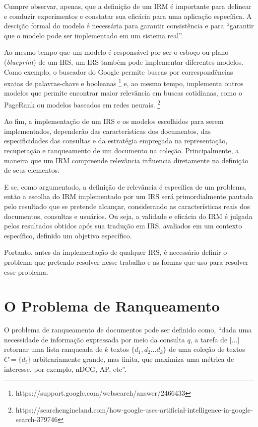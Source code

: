 \documentclass[
	12pt,				%
	openright,			%
	oneside,			%
	a4paper,			%
	english,			%
	french,				%
	spanish,			%
	brazil				%
	]{abntex2}
\begin{document}
Cumpre observar, apenas, que a definição de um IRM é importante para delinear e conduzir experimentos e constatar sua eficácia para uma aplicação específica.
A descição formal do modelo é necessária para garantir consistência e para ``garantir que o modelo pode ser implementado em um sistema real''.\cite{Hiemstra2009}

Ao mesmo tempo que um modelo é responsável por ser o esboço ou plano (\textit{blueprint}) de um IRS, um IRS também pode implementar diferentes modelos.
Como exemplo, o buscador do Google permite buscas por correspondências exatas de palavras-chave e booleanas
\footnote{https://support.google.com/websearch/answer/2466433}
e, ao mesmo tempo, implementa outros modelos que permite encontrar maior relevância em buscas cotidianas, como o PageRank ou modelos baseados em redes neurais.
\footnote{https://searchengineland.com/how-google-uses-artificial-intelligence-in-google-search-379746}

Ao fim, a implementação de um IRS e os modelos escolhidos para serem implementados, dependerão das características dos documentos, das especificidades das consultas e da estratégia empregada na representação, recuperação e ranqueamento de um documento na coleção.
Principalmente, a maneira que um IRM compreende relevância influencia diretamente na definição de seus elementos.

E se, como argumentado, a definição de relevância é específica de um problema, então a escolha do IRM implementado por um IRS será primordialmente pautada pelo resultado que se pretende alcançar, considerando as características reais dos documentos, consultas e usuários.
Ou seja, a validade e eficácia do IRM é julgada pelos resultados obtidos após sua tradução em IRS, avaliados em um contexto específico, definido um objetivo específico.

Portanto, antes da implementação de qualquer IRS, é necessário definir o problema que pretendo resolver nesse trabalho e as formas que uso para resolver esse problema.

\section{O Problema de Ranqueamento}\label{sec:o-problema-de-ranqueamento}

O problema de ranqueamento de documentos pode ser definido como, ``dada uma necessidade de informação expressada por meio da consulta $q$, a tarefa de [...] retornar uma lista
ranqueada de $k$ textos $\{d_1, d_2 ... d_k\}$ de uma coleção de textos $C = \{d_i\}$ arbitrariamente grande, mas finita, que maximiza uma métrica de interesse, por exemplo, nDCG, AP, etc''\cite{}.
\end{document}
